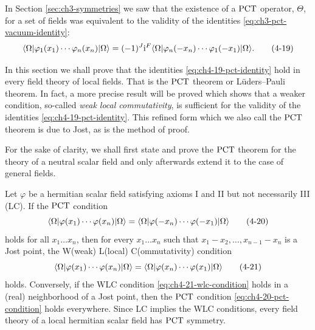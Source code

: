 In Section \ref{sec:ch3-symmetries} we saw that the existence of a $\mathrm{PCT}$ operator, $\Theta$, for
a set of fields was equivalent to the validity of the identities \eqref{eq:ch3-pct-vacuum-identity}:
\begin{equation}
  \langle \Omega\rvert\varphi_1(x_1)\cdots\varphi_n(x_n)\lvert \Omega\rangle
  =(-1)^J\mathrm{i}^F
  \langle \Omega\rvert\varphi_n(-x_n)\cdots\varphi_1(-x_1)\lvert \Omega\rangle.
  \tag{4-19}\label{eq:ch4-19-pct-identity}
\end{equation}

In this section we shall prove that the identities \eqref{eq:ch4-19-pct-identity} hold in every field
theory of local fields. That is the $\mathrm{PCT}$ theorem or Lüders--Pauli theorem.
In fact, a more precise result will be proved which shows that a weaker
condition, so-called \emph{weak local commutativity}, is sufficient
for the validity of the identities \eqref{eq:ch4-19-pct-identity}. This refined form which we also
call the $\mathrm{PCT}$ theorem is due to Jost, as is the method of proof.

For the sake of clarity, we shall first state and prove the $\mathrm{PCT}$ theorem for
the theory of a neutral scalar field and only afterwards extend it to the case
of general fields.

\begin{theorem}
\label{thm:ch4-6-neutral-scalar-pct}

Let $\varphi$ be a hermitian scalar field satisfying axioms I and II but not
necessarily III (LC). If the $\mathrm{PCT}$ condition
\begin{equation}
  \langle \Omega\rvert\varphi(x_1)\cdots\varphi(x_n)\lvert \Omega\rangle
  =\langle \Omega\rvert\varphi(-x_n)\cdots\varphi(-x_1)\lvert \Omega\rangle
  \tag{4-20}\label{eq:ch4-20-pct-condition}
\end{equation}
holds for all $x_1\ldots x_n$, then for every $x_1\ldots x_n$ such that
$x_1-x_2,\ldots,x_{n-1}-x_n$ is a Jost point, the W(weak) L(local)
C(ommutativity) condition
\begin{equation}
  \langle \Omega\rvert\varphi(x_1)\cdots\varphi(x_n)\lvert \Omega\rangle
  =\langle \Omega\rvert\varphi(x_n)\cdots\varphi(x_1)\lvert \Omega\rangle
  \tag{4-21}\label{eq:ch4-21-wlc-condition}
\end{equation}
holds. Conversely, if the WLC condition \eqref{eq:ch4-21-wlc-condition} holds in a (real)
neighborhood of a Jost point, then the $\mathrm{PCT}$ condition \eqref{eq:ch4-20-pct-condition} holds
everywhere. Since LC implies the WLC conditions, every field theory of a local
hermitian scalar field has $\mathrm{PCT}$ symmetry.
\end{theorem}

